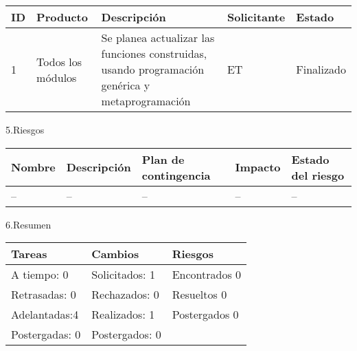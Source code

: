 \documentclass[12pt]{report}
\numberwithin{equation}{section}
\begin{document}
\begin{flushleft}
\begin{table}[H]
\begin{tabular}{|m{0.5cm}|m{2cm}|m{4.5cm}|m{3.5cm}|m{3.5cm}|}
\hline 
\textbf{ID} & \textbf{Producto} & \textbf{Descripci\'on} & \textbf{Solicitante} & \textbf{Estado}  \\
\hline
\hline
1 & \small{Todos los módulos}  & \small{Se planea actualizar las funciones construidas, usando programaci\'on genérica y metaprogramaci\'on} &\small{ET} & \small{Finalizado}\\
\hline
\end{tabular}
\label{tabla: TABLA CE Cambios Seg}
\end{table}

\large{5.Riesgos}\\


\begin{table}[H]
\begin{tabular}{|m{2cm}|m{4cm}|m{4cm}|m{2cm}|m{2cm}|}
\hline 
\textbf{Nombre } & \textbf{Descripci\'on} & \textbf{Plan de contingencia} & \textbf{Impacto} & \textbf{Estado del riesgo}  \\
\hline
\hline
\small{--} &\small{--} & \small{--} & --   & -- \\
\hline
\end{tabular}
\label{tabla: TABLA CE de nuevos riesgos Seg}
\end{table}

\large{6.Resumen}\\

\begin{table}[H]
\begin{tabular}{|m{5cm}|m{5cm}|m{5cm}|}
\hline
\textbf{Tareas} & \textbf{Cambios} & \textbf{Riesgos}\\
\hline \hline 
A tiempo: 0 & Solicitados: 1 & Encontrados 0 \\
\hline
Retrasadas: 0 & Rechazados: 0 & Resueltos 0 \\
\hline
Adelantadas:4  & Realizados: 1  & Postergados 0 \\
\hline
Postergadas: 0 & Postergados:  0 & \\
\hline
\end{tabular}
\label{tabla: TABLA CE Resumen}
\end{table}

\end{flushleft}
\end{document}
